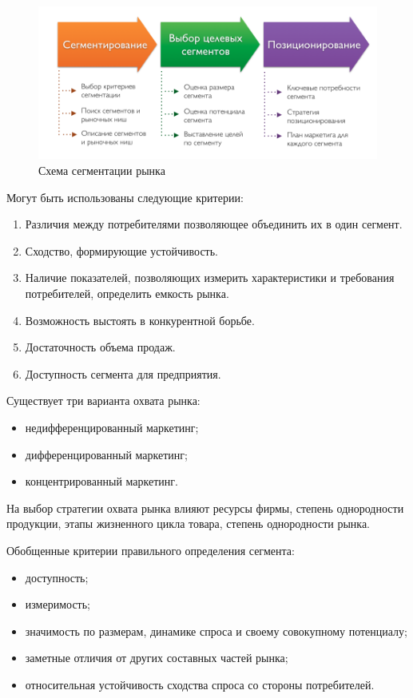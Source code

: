 \documentclass[a4paper,12pt,oneside,final]{extarticle}
\numberwithin{equation}{section}
\begin{document}
\begin{figure}[h]
	\centering
	\includegraphics[width=\textwidth]{management-figures/marketing_segmentation_process}
	\caption{Схема сегментации рынка}
\end{figure}

Могут быть использованы следующие критерии:
\begin{enumerate}
	\item Различия между потребителями позволяющее объединить их в один сегмент.
	\item Сходство, формирующие устойчивость.
	\item Наличие показателей, позволяющих измерить характеристики и требования потребителей, определить емкость рынка.
	\item Возможность выстоять в конкурентной борьбе.
	\item Достаточность объема продаж.
	\item Доступность сегмента для предприятия.
\end{enumerate}

Существует три варианта охвата рынка:
\begin{itemize}
	\item недифференцированный маркетинг;
	\item дифференцированный маркетинг;
	\item концентрированный маркетинг.
\end{itemize}

На выбор стратегии охвата рынка влияют ресурсы фирмы, степень однородности продукции, этапы жизненного цикла товара, степень однородности рынка.

Обобщенные критерии правильного определения сегмента:
\begin{itemize}
\item доступность;
\item измеримость;
\item значимость по размерам, динамике спроса и своему совокупному потенциалу;
\item заметные отличия от других составных частей рынка;
\item относительная устойчивость сходства спроса со стороны потребителей.
\end{itemize}
\end{document}
